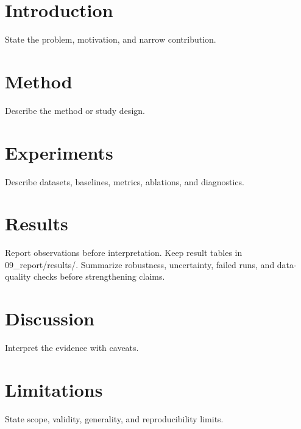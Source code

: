 \documentclass{article}
\title{\detokenize{{{PROJECT_NAME}}}}
\author{}
\date{}
\begin{document}
\maketitle

\begin{abstract}
Write the evidence-backed abstract here.
\end{abstract}

\section{Introduction}
State the problem, motivation, and narrow contribution.

\section{Method}
Describe the method or study design.

\section{Experiments}
Describe datasets, baselines, metrics, ablations, and diagnostics.

\section{Results}
Report observations before interpretation. Keep result tables in
09\_report/results/.
Summarize robustness, uncertainty, failed runs, and data-quality checks before
strengthening claims.

\section{Discussion}
Interpret the evidence with caveats.

\section{Limitations}
State scope, validity, generality, and reproducibility limits.
\end{document}
